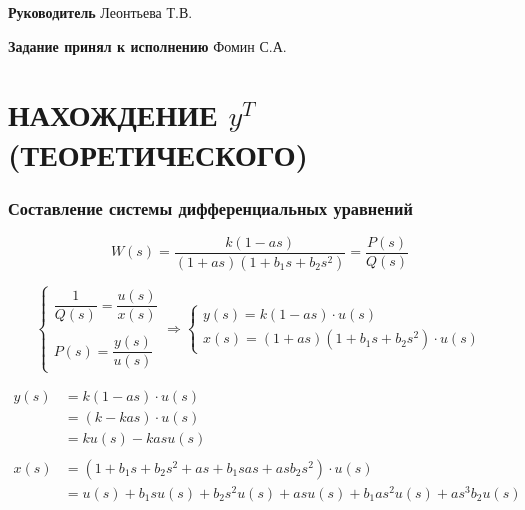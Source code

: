 \documentclass[a4paper, 12pt]{article}
\begin{document}
\vfill

\noindent \textbf{Руководитель} \hfill
\hfill \uline{\hspace{3cm}} \hspace{1.1cm} Леонтьева Т.В.

\vspace{1cm}

\noindent \textbf{Задание принял к исполнению} \hfill
\hfill \uline{\hspace{3cm}} \hspace{1.7cm} Фомин С.А.


\newpage
\part{НАХОЖДЕНИЕ $y^T$ (ТЕОРЕТИЧЕСКОГО)}
\section{Составление системы дифференциальных уравнений}

$$
    W(s) = \frac{k(1-as)}{(1+as)(1+b_1s+b_2s^2)} = \frac{P(s)}{Q(s)}
$$

\vspace{1cm}

$$
    \begin{cases}
        \dfrac{1}{Q(s)} = \dfrac{u(s)}{x(s)}
        \\\\ %
        P(s) = \dfrac{y(s)}{u(s)}
    \end{cases}
    \Rightarrow
    \begin{cases}
        y(s) = k(1-as) \cdot u(s)
        \\
        x(s) = (1+as)(1+b_1s+b_2s^2) \cdot u(s)
    \end{cases}
$$

\vspace{1cm}

$$
    \begin{aligned}
        y(s)
        &= k(1-as) \cdot u(s) \\
        &= (k-kas) \cdot u(s) \\
        &= ku(s) - kasu(s)
        \\\\
        x(s)
        &= (1+b_1s + b_2s^2 + as + b_1sas + asb_2s^2) \cdot u(s) \\
        &= u(s) + b_1su(s) + b_2s^2u(s) + asu(s) + b_1as^2u(s) + as^3b_2u(s)
    \end{aligned}
$$
\end{document}
